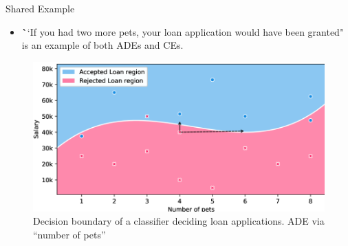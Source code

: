 \documentclass[10pt,compress,t,notes=noshow, xcolor=table]{beamer}
\begin{document}
\begin{frame}{Shared Example }
\begin{itemize}
\item \textbf``If you had two more pets, your loan application would have been granted" is an example of both ADEs and CEs.
\end{itemize}
\begin{figure}[h]
\centering
\includegraphics[width=0.6\linewidth]{figure/AEloanApplication.png}\\
   \centering
  {Decision boundary of a classifier deciding loan applications. ADE via ``number of pets''}
  \label{fig:mnist}
\end{figure} 
\end{frame}

\endlecture
\end{document}
